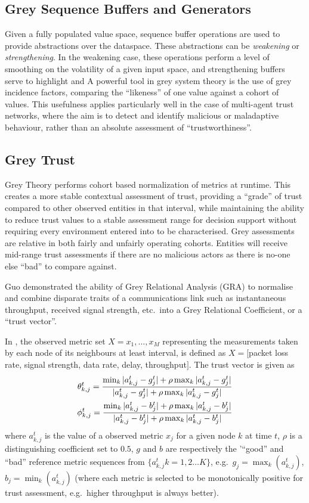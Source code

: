 \subsection{Grey Sequence Buffers and Generators}
Given a fully populated value space, sequence buffer operations are used to provide abstractions over the dataspace.
These abstractions can be \emph{weakening} or \emph{strengthening}.
In the weakening case, these operations perform a level of smoothing on the volatility of a given input space, and strengthening buffers serve to highlight and 
A powerful tool in grey system theory is the use of grey incidence factors, comparing the ``likeness'' of one value against a cohort of values.
This usefulness applies particularly well in the case of multi-agent trust networks, where the aim is to detect and identify malicious or maladaptive behaviour, rather than an absolute assessment of ``trustworthiness''.

\subsection{Grey Trust}
Grey Theory performs cohort based normalization of metrics at runtime.
This creates a more stable contextual assessment of trust, providing a ``grade'' of trust compared to other observed entities in that interval, while maintaining the ability to reduce trust values to a stable assessment range for decision support without requiring every environment entered into to be characterised.
Grey assessments are relative in both fairly and unfairly operating cohorts.
Entities will receive mid-range trust assessments if there are no malicious actors as there is no-one else ``bad'' to compare against.

Guo\cite{Guo11} demonstrated the ability of Grey Relational Analysis (GRA)\cite{Zuo1995} to normalise and combine disparate traits of a communications link such as instantaneous throughput, received signal strength, etc.\ into a Grey Relational Coefficient, or a ``trust vector''.

In \cite{Guo11}, the observed metric set $X = {x_1,\dots,x_M}$ representing the measurements taken by each node of its neighbours at least interval, is defined as $X=[$packet loss rate, signal strength, data rate, delay, throughput$]$.
The trust vector is given as
%
\begin{align}
  \label{eq:grc}
  \theta_{k,j}^t = \frac{\min_k|a_{k,j}^t - g_j^t| + \rho \max_k|a_{k,j}^t-g_j^t|}{|a_{k,j}^t-g_j^t| + \rho \max_k|a_{k,j}^t-g_j^t|} \\
  \phi_{k,j}^t = \frac{\min_k|a_{k,j}^t - b_j^t| + \rho \max_k|a_{k,j}^t-b_j^t|}{|a_{k,j}^t-b_j^t| + \rho \max_k|a_{k,j}^t-b_j^t|} \notag 
\end{align}
%
where $a_{k,j}^t$ is the value of a observed metric $x_j$ for a given node $k$ at time $t$, $\rho$ is a distinguishing coefficient set to $0.5$, $g$ and $b$ are respectively the '``good'' and ``bad'' reference metric sequences from $\{a_{k,j}^t k=1,2\dots K\}$, e.g.\ $g_j=\max_k({a_{k,j}^t})$,  $b_j=\min_k({a_{k,j}^t})$ (where each metric is selected to be monotonically positive for trust assessment, e.g.\ higher throughput is always better).

